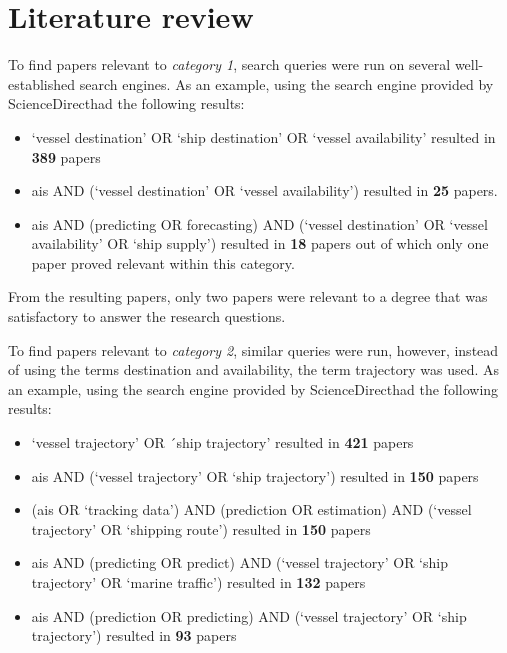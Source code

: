 \section{Literature review}
\label{sec:lit_review}

To find papers relevant to \textit{category 1}, search queries were run on several well-established search engines. As an example, using the search engine provided by ScienceDirect\footnotemark had the following results:

\begin{itemize}
    \item `vessel destination' OR `ship destination' OR `vessel availability' resulted in \textbf{389} papers
    \item ais AND (`vessel destination' OR `vessel availability') resulted in \textbf{25} papers.
    \item ais AND (predicting OR forecasting) AND (`vessel destination' OR `vessel availability' OR `ship supply') resulted in \textbf{18} papers out of which only one paper proved relevant within this category.
\end{itemize}

From the resulting papers, only two papers were relevant to a degree that was satisfactory to answer the research questions.

To find papers relevant to \textit{category 2}, similar queries were run, however, instead of using the terms destination and availability, the term trajectory was used. As an example, using the search engine provided by ScienceDirect\footnotemark[\value{footnote}] had the following results:


\begin{itemize}
    \item `vessel trajectory' OR ´ship trajectory' resulted in \textbf{421} papers
    \item ais AND (`vessel trajectory' OR `ship trajectory') resulted in \textbf{150} papers
    \item (ais OR `tracking data') AND (prediction OR estimation) AND (`vessel trajectory' OR `shipping route') resulted in \textbf{150} papers
    \item ais AND (predicting OR predict) AND (`vessel trajectory' OR `ship trajectory' OR `marine traffic') resulted in \textbf{132} papers
    \item ais AND (prediction OR predicting) AND (`vessel trajectory' OR `ship trajectory') resulted in \textbf{93} papers
\end{itemize}

